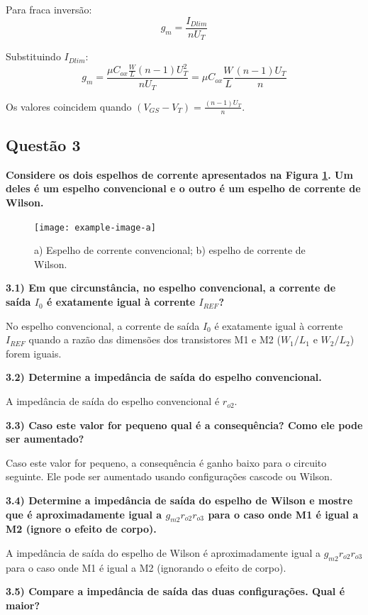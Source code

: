 \documentclass[12pt,a4paper]{article}
\begin{document}
Para fraca inversão:
$$g_m = \frac{I_{Dlim}}{nU_T}$$

Substituindo $I_{Dlim}$:
$$g_m = \frac{\mu C_{ox} \frac{W}{L} (n-1) U_T^2}{nU_T} = \mu C_{ox} \frac{W}{L} \frac{(n-1)U_T}{n}$$

Os valores coincidem quando $(V_{GS} - V_T) = \frac{(n-1)U_T}{n}$.

\subsection*{Questão 3}

\textbf{Considere os dois espelhos de corrente apresentados na Figura \ref{fig:espelhos_corrente}. Um deles é um espelho convencional e o outro é um espelho de corrente de Wilson.}

\begin{figure}[H]
    \centering
    \texttt{[image: example-image-a]}
    \caption{a) Espelho de corrente convencional; b) espelho de corrente de Wilson.}
    \label{fig:espelhos_corrente}
\end{figure}

\textbf{3.1) Em que circunstância, no espelho convencional, a corrente de saída $I_0$ é exatamente igual à corrente $I_{REF}$?}

No espelho convencional, a corrente de saída $I_0$ é exatamente igual à corrente $I_{REF}$ quando a razão das dimensões dos transistores M1 e M2 ($W_1/L_1$ e $W_2/L_2$) forem iguais.

\textbf{3.2) Determine a impedância de saída do espelho convencional.}

A impedância de saída do espelho convencional é $r_{o2}$.

\textbf{3.3) Caso este valor for pequeno qual é a consequência? Como ele pode ser aumentado?}

Caso este valor for pequeno, a consequência é ganho baixo para o circuito seguinte. Ele pode ser aumentado usando configurações cascode ou Wilson.

\textbf{3.4) Determine a impedância de saída do espelho de Wilson e mostre que é aproximadamente igual a $g_{m2} r_{o2} r_{o3}$ para o caso onde M1 é igual a M2 (ignore o efeito de corpo).}

A impedância de saída do espelho de Wilson é aproximadamente igual a $g_{m2} r_{o2} r_{o3}$ para o caso onde M1 é igual a M2 (ignorando o efeito de corpo).

\textbf{3.5) Compare a impedância de saída das duas configurações. Qual é maior?}
\end{document}
